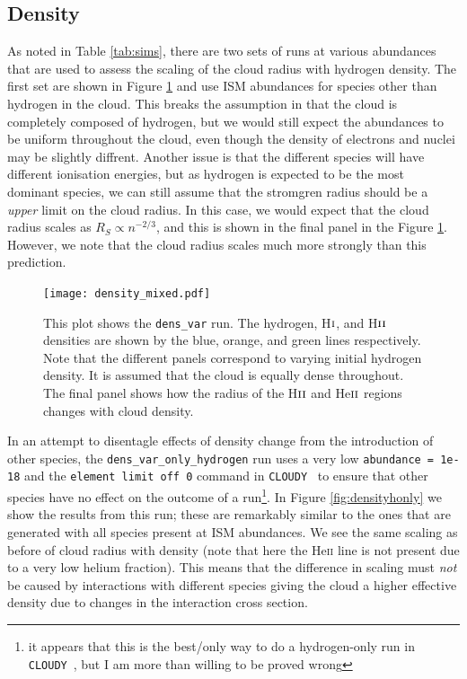 \documentclass[a4paper]{article}
\newcommand{\cloudy}{{\tt CLOUDY}~}
\begin{document}
\subsection{Density}

As noted in Table \ref{tab:sims}, there are two sets of runs at various
abundances that are used to assess the scaling of the cloud radius with
hydrogen density. The first set are shown in Figure \ref{fig:density} and use
ISM abundances for species other than hydrogen in the cloud. This breaks the
assumption in \citet{stromgren_physical_1939} that the cloud is completely
composed of hydrogen, but we would still expect the abundances to be uniform
throughout the cloud, even though the density of electrons and nuclei may be
slightly diffrent. Another issue is that the different species will have
different ionisation energies, but as hydrogen is expected to be the most
dominant species, we can still assume that the stromgren radius should be a
\emph{upper} limit on the cloud radius. In this case, we would expect that the
cloud radius scales as $R_S \propto n^{-2/3}$, and this is shown in the final 
panel in the Figure \ref{fig:density}. However, we note that the cloud radius
scales much more strongly than this prediction.

\begin{figure}[!h]
\centering
\texttt{[image: density\_mixed.pdf]}
    \caption{\small This plot shows the {\tt dens\_var} run.
        The hydrogen, H$\textsc{i}$, and H$\textsc{ii}$ densities are shown by
        the blue, orange, and green lines respectively. Note that the different
        panels correspond to varying initial hydrogen density. It is assumed
        that the cloud is equally dense throughout. The final panel shows how
        the radius of the H$\textsc{ii}$ and He$\textsc{ii}$ regions changes
        with cloud density.}
    \label{fig:density}
\end{figure}
In an attempt to disentagle effects of density change from the introduction
of other species, the {\tt dens\_var\_only\_hydrogen} run uses a very low
{\tt abundance = 1e-18} and the {\tt element limit off 0} command in \cloudy
to ensure that other species have no effect on the outcome of a run\footnote{
    it appears that this is the best/only way to do a hydrogen-only run in 
    \cloudy, but I am more than willing to be proved wrong}.
In Figure \ref{fig:densityhonly} we show the results from this run; these
are remarkably similar to the ones that are generated with all species present
at ISM abundances. We see the same scaling as before of cloud radius with
density (note that here the He\textsc{ii} line is not present due to a very
low helium fraction). This means that the difference in scaling must \emph{not}
be caused by interactions with different species giving the cloud a higher 
effective density due to changes in the interaction cross section.
\end{document}
